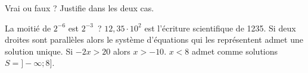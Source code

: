 %
%
    Vrai ou faux ? Justifie dans les deux cas.
    \begin{tasks}
        \task La moitié de \(2^{-6}\) est \(2^{-3}\)~?
        \task $12,35\cdot 10^2$ est l'écriture scientifique de \num{1235}.
        \task Si deux droites sont parallèles alors le système d'équations qui les représentent admet une solution unique.
        \task Si $-2x > 20$ alors $x > -10$.
        \task $x<8$ admet comme solutions $S=]-\infty; 8]$.
    \end{tasks}
